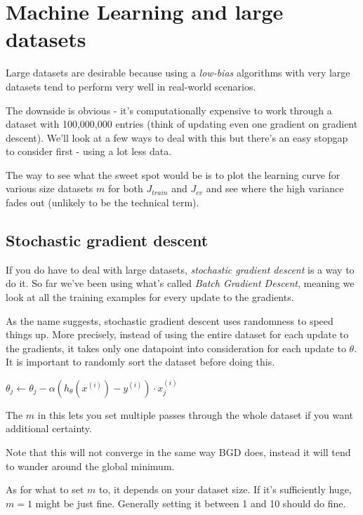 \chapter{Machine Learning and large datasets}
Large datasets are desirable because using a \emph{low-bias} algorithms with very large datasets tend to perform very well in real-world scenarios.

The downside is obvious - it's computationally expensive to work through a dataset with 100,000,000 entries (think of updating even one gradient on gradient descent). We'll look at a few ways to deal with this but there's an easy stopgap to consider first - using a lot less data.

The way to see what the sweet spot would be is to plot the learning curve for various size datasets $m$ for both $J_{train}$ and $J_{cv}$ and see where the high variance fades out (unlikely to be the technical term).

\section{Stochastic gradient descent}

If you do have to deal with large datasets, \emph{stochastic gradient descent} is a way to do it. So far we've been using what's called \emph{Batch Gradient Descent}, meaning we look at all the training examples for every update to the gradients.

As the name suggests, stochastic gradient descent uses randomness to speed things up. More precisely, instead of using the entire dataset for each update to the gradients, it takes only one datapoint into consideration for each update to $\theta$. It is important to randomly sort the dataset before doing this.

\begin{algorithmic}
\REPEAT
		\STATE $\theta_j \gets \theta_j -
		\alpha (h_\theta(x^{(i)}) - y^{(i)}) \cdot x^{(i)}_j$
	\ENDFOR
{}
\end{algorithmic}

The $m$ in this lets you set multiple passes through the whole dataset if you want additional certainty.

Note that this will not converge in the same way BGD does, instead it will tend to wander around the global minimum.

As for what to set $m$ to, it depends on your dataset size. If it's sufficiently huge, $m = 1$ might be just fine. Generally setting it between 1 and 10 should do fine.


